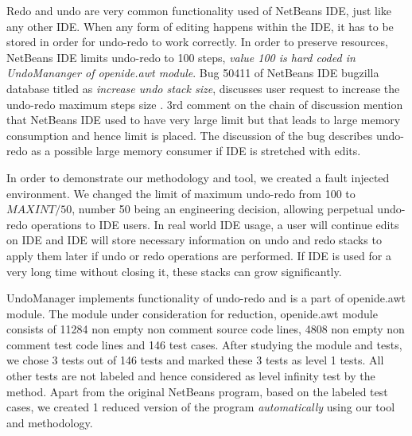 


Redo and undo are very common functionality used of NetBeans IDE, just like any other IDE. When any form of editing happens within the IDE, it has to be stored in order for undo-redo to work correctly. In order to preserve resources, NetBeans IDE limits undo-redo to 100 steps, \emph{value 100 is hard coded in UndoMananger of openide.awt module}. Bug 50411 of NetBeans IDE bugzilla database titled as \emph{increase undo stack size}, discusses user request to increase the undo-redo maximum steps size \cite{bug45011}. 3rd comment on the chain of discussion mention that NetBeans IDE used to have very large limit but that leads to large memory consumption and hence limit is placed. The discussion of the bug describes undo-redo as a possible large memory consumer if IDE is stretched with edits. 

In order to demonstrate our methodology and tool, we created a fault injected environment. We changed the limit of maximum undo-redo from 100 to $MAXINT / 50$, number 50 being an engineering decision, allowing perpetual undo-redo operations to IDE users.  In real world IDE usage, a user will continue edits on IDE  and IDE will store necessary information on undo and redo stacks to apply them later if undo or redo operations are performed. If IDE is used for a very long time without closing it, these stacks can grow significantly. 

UndoManager implements functionality of undo-redo and is a part of openide.awt module. The module under consideration for reduction, openide.awt module consists of 11284 non empty non comment source code lines, 4808 non empty non comment test code lines and 146 test cases. After studying the module and tests, we chose 3 tests out of 146 tests and marked these 3 tests as level 1 tests. All other tests are not labeled and hence considered as level infinity test by the method. Apart from the original NetBeans program, based on the labeled test cases, we created 1 reduced version of the program \emph{automatically} using our tool and methodology. 

